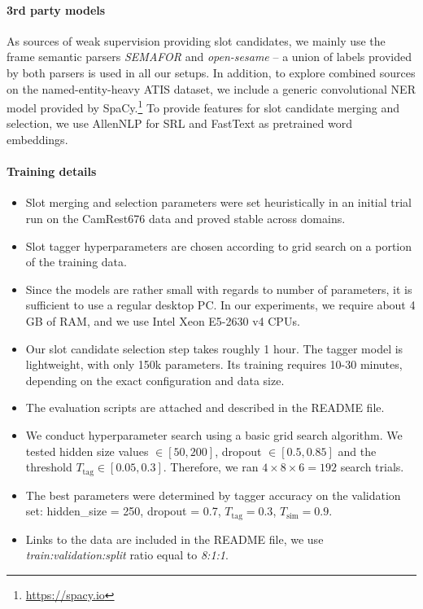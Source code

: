 \paragraph{3rd party models}
As sources of weak supervision providing slot candidates, we mainly use the frame semantic parsers \textit{SEMAFOR} \cite{das2010semafor} and \textit{open-sesame} \cite{swayamdipta2017frame} -- a union of labels provided by both parsers is used in all our setups. In addition, to explore combined sources on the named-entity-heavy ATIS dataset, we include a generic convolutional NER model provided by SpaCy.\footnote{\url{https://spacy.io}}
To provide features for slot candidate merging and selection, we use AllenNLP \cite{Gardner2017AllenNLP} for SRL
and FastText \cite{bojanowski2017enriching} as pretrained word embeddings.

\paragraph{Training details}
\begin{itemize}
    \item Slot merging and selection parameters were set heuristically in an initial trial run on the CamRest676 data and proved stable across domains.
    \item Slot tagger hyperparameters are chosen according to grid search on a portion of the training data.
    \item Since the models are rather small with regards to number of parameters, it is sufficient to use a regular desktop PC. In our experiments, we require about 4 GB of RAM, and we use Intel Xeon E5-2630 v4 CPUs. 
    \item Our slot candidate selection step takes roughly 1 hour.
    The tagger model is lightweight, with only 150k parameters. Its training requires 10-30 minutes, depending on the exact configuration and data size.
    \item The evaluation scripts are attached and described in the README file.
    \item We conduct hyperparameter search using a basic grid search algorithm. We tested hidden size values $\in [50,200]$, dropout $\in [0.5,0.85]$ and the threshold $T_{\text{tag}} \in [0.05,0.3]$. Therefore, we ran $4\times8\times6 = 192$ search trials.
    \item The best parameters were determined by tagger accuracy on the validation set: hidden\_size = 250, dropout = 0.7, $T_{\text{tag}} = 0.3$, $T_{\text{sim}} = 0.9$.
    \item Links to the data are included in the README file, we use \emph{train:validation:split} ratio equal to \emph{8:1:1}.
\end{itemize}


